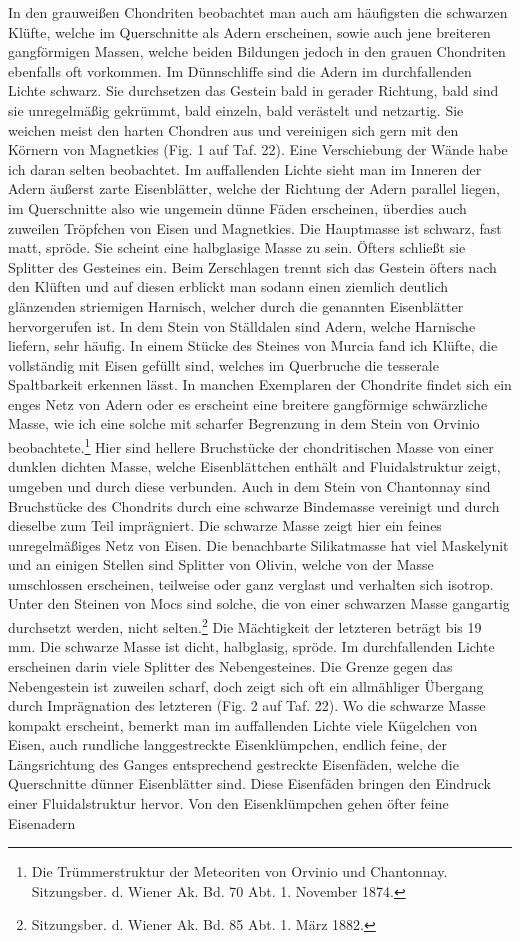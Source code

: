 \documentclass[a4paper, 12pt, oneside]{article}
\begin{document}
In den grauweißen Chondriten beobachtet man auch am häufigsten die schwarzen Klüfte, welche im Querschnitte als Adern erscheinen, sowie auch jene breiteren gangförmigen Massen, welche beiden Bildungen jedoch in den grauen Chondriten ebenfalls oft vorkommen. Im Dünnschliffe sind die Adern im durchfallenden Lichte schwarz. Sie durchsetzen das Gestein bald in gerader Richtung, bald sind sie unregelmäßig gekrümmt, bald einzeln, bald verästelt und netzartig. Sie weichen meist den harten Chondren aus und vereinigen sich gern mit den Körnern von Magnetkies (Fig. 1 auf Taf. 22). Eine Verschiebung der Wände habe ich daran selten beobachtet. Im auffallenden Lichte sieht man im Inneren der Adern äußerst zarte Eisenblätter, welche der Richtung der Adern parallel liegen, im Querschnitte also wie ungemein dünne Fäden erscheinen, überdies auch zuweilen Tröpfchen von Eisen und Magnetkies. Die Hauptmasse ist schwarz, fast matt, spröde. Sie scheint eine halbglasige Masse zu sein. Öfters schließt sie Splitter des Gesteines ein. Beim Zerschlagen trennt sich das Gestein öfters nach den Klüften und auf diesen erblickt man sodann einen ziemlich deutlich glänzenden striemigen Harnisch, welcher durch die genannten Eisenblätter hervorgerufen ist. In dem Stein von Ställdalen sind Adern, welche Harnische liefern, sehr häufig. In einem Stücke des Steines von Murcia fand ich Klüfte, die vollständig mit Eisen gefüllt sind, welches im Querbruche die tesserale Spaltbarkeit erkennen lässt. In manchen Exemplaren der Chondrite findet sich ein enges Netz von Adern oder es erscheint eine breitere gangförmige schwärzliche Masse, wie ich eine solche mit scharfer Begrenzung in dem Stein von Orvinio beobachtete.\footnote{Die Trümmerstruktur der Meteoriten von Orvinio und Chantonnay. Sitzungsber. d. Wiener Ak. Bd. 70 Abt. 1. November 1874.} Hier sind hellere Bruchstücke der chondritischen Masse von einer dunklen dichten Masse, welche Eisenblättchen enthält and Fluidalstruktur zeigt, umgeben und durch diese verbunden. Auch in dem Stein von Chantonnay sind Bruchstücke des Chondrits durch eine schwarze Bindemasse vereinigt und durch dieselbe zum Teil imprägniert. Die schwarze Masse zeigt hier ein feines unregelmäßiges Netz von Eisen. Die benachbarte Silikatmasse hat viel Maskelynit und an einigen Stellen sind Splitter von Olivin, welche von der Masse umschlossen erscheinen, teilweise oder ganz verglast und verhalten sich isotrop. Unter den Steinen von Mocs sind solche, die von einer schwarzen Masse gangartig durchsetzt werden, nicht selten.\footnote{Sitzungsber. d. Wiener Ak. Bd. 85 Abt. 1. März 1882.} Die Mächtigkeit der letzteren beträgt bis 19 mm. Die schwarze Masse ist dicht, halbglasig, spröde. Im durchfallenden Lichte erscheinen darin viele Splitter des Nebengesteines. Die Grenze gegen das Nebengestein ist zuweilen scharf, doch zeigt sich oft ein allmähliger Übergang durch Imprägnation des letzteren (Fig. 2 auf Taf. 22). Wo die schwarze Masse kompakt erscheint, bemerkt man im auffallenden Lichte viele Kügelchen von Eisen, auch rundliche langgestreckte Eisenklümpchen, endlich feine, der Längsrichtung des Ganges entsprechend gestreckte Eisenfäden, welche die Querschnitte dünner Eisenblätter sind. Diese Eisenfäden bringen den Eindruck einer Fluidalstruktur hervor. Von den Eisenklümpchen gehen öfter feine Eisenadern 
\end{document}
